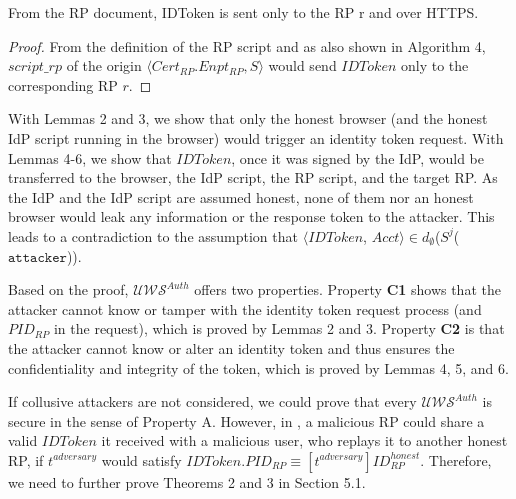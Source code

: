 \begin{lemma}
From the RP document, IDToken is sent only to the RP r and over HTTPS.
\end{lemma}

\begin{proof}
From the definition of the RP script and as also shown in Algorithm 4, %
$script\_rp$ of the origin $\langle Cert_{RP}.Enpt_{RP}, S \rangle$ would send $IDToken$ only to the corresponding RP $r$. 
\end{proof}

With Lemmas 2 and 3, we show that only the honest browser (and the honest IdP script running in the browser) would trigger an identity token request. With Lemmas 4-6, we show that $IDToken$, once it was signed by the IdP, would be transferred to the browser, the IdP script, the RP script, and the target RP. As the IdP and the IdP script are assumed honest, none of them nor an honest browser would leak any information or the response token to the attacker. This leads to a contradiction to the assumption that $\langle IDToken$, $Acct \rangle \in d_{\emptyset}$($S^j$($\mathtt{attacker}$)). 

Based on the proof, $\mathcal{UWS}^{Auth}$ offers two properties. Property {\bf C1} shows that the attacker cannot know or tamper with the identity token request process (and $PID_{RP}$ in the request), which is proved by Lemmas 2 and 3. Property {\bf C2} is that the attacker cannot know or alter an identity token and thus ensures the confidentiality and integrity of the token, which is proved by Lemmas 4, 5, and 6.

If collusive attackers are not considered, we could prove that every $\mathcal{UWS}^{Auth}$ is secure in the sense of Property A. However, in \usso, a malicious RP could share a valid $IDToken$ it received with a malicious user, who replays it to another honest RP, if $t^{adversary}$ would satisfy $IDToken.PID_{RP} \equiv [t^{adversary}]ID_{RP}^{honest}$. Therefore, we need to further prove Theorems 2 and 3 in Section 5.1.


